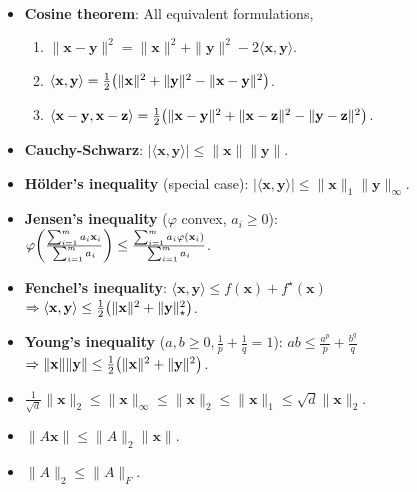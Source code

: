 \documentclass[a4paper]{article}
\newcommand{\lft}{\mathopen{}\mathclose\bgroup\left}
\newcommand{\rgt}{\aftergroup\egroup\right}
\renewcommand{\vec}[1]{\mathbf{#1}}
\newcommand{\mat}[1]{#1}
\newenvironment{topic}[1]
{\textbf{\sffamily \colorbox{black}{\rlap{\textbf{\textcolor{white}{#1}}}\hspace{\linewidth}\hspace{-2\fboxsep}}} \\ \vspace{0.2cm}}
{}
\begin{document}
\begin{multicols*}{2}
    \begin{topic}{Lemmas}
        \begin{itemize}
            \item \textbf{Cosine theorem}: All equivalent formulations,
                  \begin{enumerate}
                      \item $\| \vec{x} - \vec{y} \|^2 = \| \vec{x} \|^2 + \| \vec{y} \|^2 - 2 \langle \vec{x}, \vec{y} \rangle$.
                      \item $\langle \vec{x}, \vec{y} \rangle = \frac{1}{2} \lft( \| \vec{x} \|^2 + \| \vec{y} \|^2 - \| \vec{x} - \vec{y} \|^2 \rgt)$.
                      \item $\langle \vec{x} - \vec{y}, \vec{x} - \vec{z} \rangle = \frac{1}{2} \lft( \| \vec{x} - \vec{y} \|^2 + \| \vec{x} - \vec{z} \|^2 - \| \vec{y} - \vec{z} \|^2 \rgt)$.
                  \end{enumerate}
            \item \textbf{Cauchy-Schwarz}: $|\langle \vec{x}, \vec{y} \rangle| \leq \| \vec{x} \| \| \vec{y} \|$.
            \item \textbf{H\"older's inequality} (special case): $|\langle \vec{x}, \vec{y} \rangle| \leq \| \vec{x} \|_1 \| \vec{y} \|_\infty$.
            \item \textbf{Jensen's inequality} ($\varphi$ convex, $a_i \geq 0$): \\ $\varphi \lft( \frac{\sum_{i=1}^{m} a_i \vec{x}_i}{\sum_{i=1}^{m} a_i} \rgt) \leq \frac{\sum_{i=1}^{m} a_i \varphi(\vec{x}_i)}{\sum_{i=1}^{m} a_i}$.
            \item \textbf{Fenchel's inequality}: $\langle \vec{x}, \vec{y} \rangle \leq f(\vec{x}) + f^\star(\vec{x})$ \\ $\Rightarrow \langle \vec{x}, \vec{y} \rangle \leq \frac{1}{2} \lft( \| \vec{x} \|^2 + \| \vec{y} \|^2_\star \rgt)$.
            \item \textbf{Young's inequality} ($a,b \geq 0, \frac{1}{p} + \frac{1}{q} = 1$): $ab \leq \frac{a^p}{p} + \frac{b^q}{q}$ \\ $\Rightarrow \| \vec{x} \| \| \vec{y} \| \leq \frac{1}{2} \lft( \| \vec{x} \|^2 + \| \vec{y} \|^2 \rgt)$.
            \item $\frac{1}{\sqrt{d}} \| \vec{x} \|_2 \leq \| \vec{x} \|_\infty \leq \| \vec{x} \|_2 \leq \| \vec{x} \|_1 \leq \sqrt{d} \| \vec{x} \|_2$.
            \item $\| \mat{A} \vec{x} \| \leq \| \mat{A} \|_2 \| \vec{x} \|$.
            \item $\| \mat{A} \|_2 \leq \| \mat{A} \|_F$.

\end{itemize}
\end{topic}
\end{multicols*}
\end{document}
